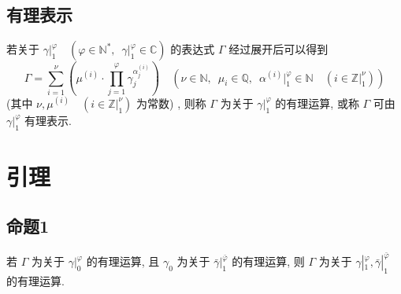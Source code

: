 \documentclass{article}
\renewcommand\.{.\hspace{3pt}}
\renewcommand\,{,\hspace{4pt}}
\renewcommand\:{:\hspace{3pt}}
\newcommand\A{,\hspace{6pt}}
\begin{document}
	\subsection{有理表示}
	若关于 $\gamma |_{1}^{\varphi} \quad \left( \varphi \in \mathbb{N^{\ast}} \A \gamma |_{1}^{\varphi} \in \mathbb{C} \right)$ 的表达式 $\Gamma$ 经过展开后可以得到
	\begin{equation}
		\Gamma = \sum_{i=1}^{\nu} \left( \mu^{(i)} \cdot \prod_{j=1}^{\varphi} \gamma_{j}^{\alpha_{j}^{(i)}} \right) \quad \left( \nu \in \mathbb{N} \A \mu_{i} \in \mathbb{Q} \A \alpha^{(i)} |_{1}^{\varphi} \in \mathbb{N} \quad \left( i \in \mathbb{Z} |_{1}^{\nu} \right) \right)
	\end{equation}
	(其中 $\nu , \mu^{(i)} \quad \left( i \in \mathbb{Z} |_{1}^{\nu} \right)$ 为常数) \, 则称 $\Gamma$ 为关于 $\gamma |_{1}^{\varphi}$ 的有理运算\, 或称 $\Gamma$ 可由 $\gamma |_{1}^{\varphi}$ 有理表示\.
	
	\section{引理}
	\subsection{命题1} \label{sec:3.1}
	若 $\Gamma$ 为关于 $\gamma |_{0}^{\varphi}$ 的有理运算\, 且 $\gamma_{0}$ 为关于 $\bar{\gamma} |_{1}^{\bar{\varphi}}$ 的有理运算\, 则 $\Gamma$ 为关于 $\gamma |_{1}^{\varphi} , \bar{\gamma} |_{1}^{\bar{\varphi}}$ 的有理运算\.
	
\end{document}
